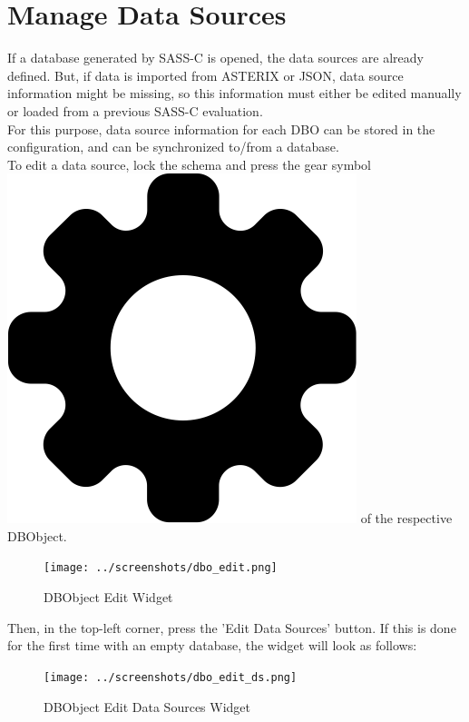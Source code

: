\section{Manage Data Sources}
\label{sec:manage_datasources}

If a database generated by SASS-C is opened, the data sources are already defined. But, if data is imported from ASTERIX or JSON, data source information might be missing, so this information must either be edited manually or loaded from a previous SASS-C evaluation. \\

For this purpose, data source information for each DBO can be stored in the configuration, and can be synchronized to/from a database. \\

To edit a data source, lock the schema and press the gear symbol \includegraphics[scale=0.02]{../../data/icons/edit.png} of the respective DBObject.

\begin{figure}[H]
  \hspace*{-1.5cm}
    \texttt{[image: ../screenshots/dbo\_edit.png]}
  \caption{DBObject Edit Widget}
  \label{fig:dbo_edit}
\end{figure}

Then, in the top-left corner, press the 'Edit Data Sources' button. If this is done for the first time with an empty database, the widget will look as follows:

\begin{figure}[H]
  \hspace*{-1cm}
    \texttt{[image: ../screenshots/dbo\_edit\_ds.png]}
  \caption{DBObject Edit Data Sources Widget}
  \label{fig:dbo_edit_ds}
\end{figure}


